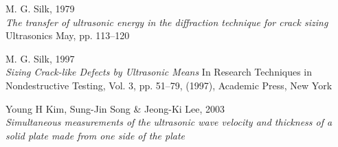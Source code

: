 \documentclass[twoside]{article}
\begin{document}
\begin{multicols}{2}
\begin{thebibliography}{99}
M. G. Silk, 1979 \\
\newblock \emph{The transfer of ultrasonic energy in the diffraction technique for crack sizing}
\newblock Ultrasonics May, pp. 113–120


M. G. Silk, 1997 \\
\newblock \emph{Sizing Crack-like Defects by Ultrasonic Means} 
\newblock In Research Techniques in Nondestructive Testing, Vol. 3, pp. 51–79, (1997), Academic Press, New York


Young H Kim, Sung-Jin Song \& Jeong-Ki Lee, 2003 \\
\newblock \emph{ Simultaneous measurements of the ultrasonic wave velocity and thickness of a solid plate made from one side of the plate}




\end{thebibliography}


\end{multicols}
\end{document}
